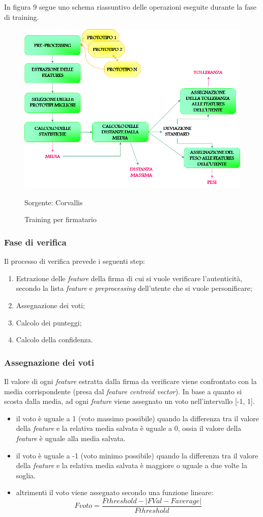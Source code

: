 In figura 9 segue uno schema riassuntivo delle operazioni eseguite durante la fase di training.
\begin{figure}[H]
\centering
\includegraphics[scale=0.6]{../Logo&Header/trainingFirmatario.png}
\caption{Training per firmatario}Sorgente: Corvallis
\end{figure}

\subsubsection*{Fase di verifica}
\label{2.1.4.2}
Il processo di verifica prevede i seguenti step:
\begin{enumerate}
\item Estrazione delle \emph{feature} della firma di cui si vuole verificare l'autenticità, secondo la lista \emph{feature} e \emph{preprocessing} dell'utente che si vuole personificare;
\item Assegnazione dei voti;
\item Calcolo dei punteggi;
\item Calcolo della confidenza.
\end{enumerate}
\subsubsection*{Assegnazione dei voti}
\label{2.1.4.3}
Il valore di ogni \emph{feature} estratta dalla firma da verificare viene confrontato con la media corrispondente (presa dal \emph{feature centroid vector}). In base a quanto si scosta dalla media, ad ogni \emph{feature} viene assegnato un voto nell'intervallo [-1, 1].
\begin{itemize}
\item il voto è uguale a 1 (voto massimo possibile) quando la differenza tra il valore della \emph{feature} e la relativa media salvata è uguale a 0, ossia il valore della \emph{feature} è uguale alla media salvata.
\item il voto è uguale a -1 (voto minimo possibile) quando la differenza tra il valore della \emph{feature} e la relativa media salvata è maggiore o uguale a due volte la soglia.
\item altrimenti il voto viene assegnato secondo una funzione lineare:
\[Fvoto=\frac{Fthreshold-|FVal-Faverage|}{Fthreshold}\]
\end{itemize}
